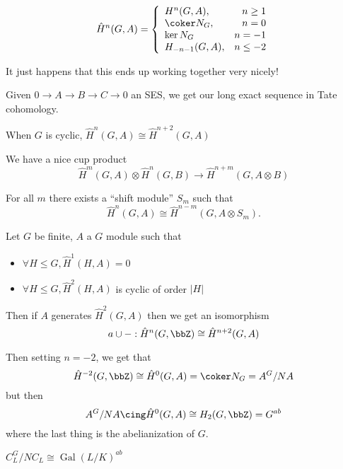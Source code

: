 \documentclass[12pt]{article}
\begin{document}
\[\hat H^n(G,A)=\left\{\begin{array}{lr} H^n(G,A),& n\ge 1\\
	\coker N_G, & n=0\\
	\ker N_G & n=-1\\
H_{-n-1}(G,A),& n\le -2\end{array}\right.\]

It just happens that this ends up working together very nicely!

\begin{prop}
	Given $0\to A\to B\to C\to 0$ an SES, we get our long exact sequence in Tate cohomology.
\end{prop}
\begin{prop}
	When $G$ is cyclic, $\hat H^n(G,A)\cong\hat H^{n+2}(G,A)$
\end{prop}
\begin{prop}
	We have a nice cup product
	\[\hat H^m(G,A)\otimes \hat H^n(G,B)\to \hat H^{n+m}(G,A\otimes B)\]
\end{prop}
\begin{prop}
	For all $m$ there exists a ``shift module'' $S_m$ such that 
	\[\hat H^n(G,A)\cong\hat H^{n-m}(G,A\otimes S_m).\]
\end{prop}
\begin{thm}[Tate]
	Let $G$ be finite, $A$ a $G$ module such that 
	\begin{itemize}
		\item $\forall H\le G,\hat H^1(H,A)=0$
		\item $\forall H\le G, \hat H^2(H,A)$ is cyclic of order $|H|$
	\end{itemize}
	Then if $A$ generates $\hat H^2(G,A)$ then we get an isomorphism
	\[a\cup -:\hat H^n(G,\bbZ)\cong \hat H^{n+2}(G,A)\]
\end{thm}
Then setting $n=-2$, we get that 
\[\hat H^{-2}(G,\bbZ)\cong\hat H^0(G,A)=\coker N_G=A^G/NA\]
but then 
\[A^G/NA\cing \hat H^0(G,A)\cong H_2(G,\bbZ)=G^{ab}\]
where the last thing is the abelianization of $G$.

$C_L^G/NC_L\cong\operatorname{Gal}(L/K)^{ab}$

\end{document}

